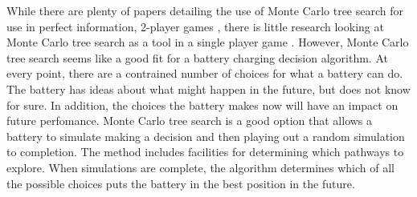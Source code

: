 While there are plenty of papers detailing the use of Monte Carlo tree search for use in perfect information, 2-player games \cite{takeuchi_evaluation_2008} \cite{browne_survey_2012}, there is little research looking at Monte Carlo tree search as a tool in a single player game \cite{schadd_single-player_2012}. However, Monte Carlo tree search seems like a good fit for a battery charging decision algorithm. At every point, there are a contrained number of choices for what a battery can do. The battery has ideas about what might happen in the future, but does not know for sure. In addition, the choices the battery makes now will have an impact on future perfomance. Monte Carlo tree search is a good option that allows a battery to simulate making a decision and then playing out a random simulation to completion. The method includes facilities for determining which pathways to explore. When simulations are complete, the algorithm determines which of all the possible choices puts the battery in the best position in the future.

